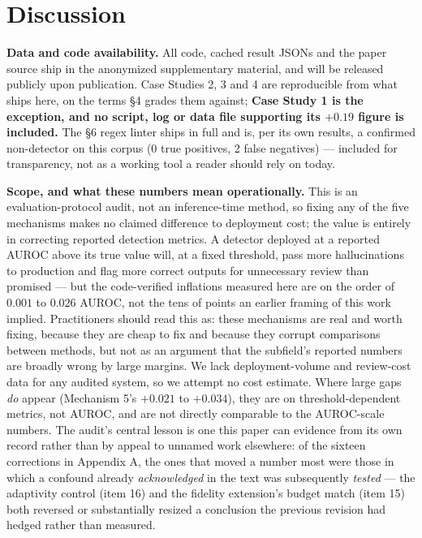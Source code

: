 \documentclass[10pt]{article} %
\begin{document}
\section{Discussion}

\textbf{Data and code availability.} All code, cached result JSONs and the paper
source ship in the anonymized supplementary material, and will be released
publicly upon publication. Case Studies 2, 3 and 4 are reproducible from what
ships here, on the terms §4 grades them against; \textbf{Case Study 1 is the
exception, and no script, log or data file supporting its $+0.19$ figure is
included.} The §6 regex linter ships in full and is, per its own results, a
confirmed non-detector on this corpus (0 true positives, 2 false negatives) ---
included for transparency, not as a working tool a reader should rely on
today.

\textbf{Scope, and what these numbers mean operationally.} This is an
evaluation-protocol audit, not an inference-time method, so fixing any of the
five mechanisms makes no claimed difference to deployment cost; the value is
entirely in correcting reported detection metrics. A detector deployed at a
reported AUROC above its true value will, at a fixed threshold, pass more
hallucinations to production and flag more correct outputs for unnecessary
review than promised --- but the code-verified inflations measured here are on
the order of $0.001$ to $0.026$ AUROC, not the tens of points an earlier
framing of this work implied. Practitioners should read this as: these
mechanisms are real and worth fixing, because they are cheap to fix and because
they corrupt comparisons between methods, but not as an argument that the
subfield's reported numbers are broadly wrong by large margins. We lack
deployment-volume and review-cost data for any audited system, so we attempt no
cost estimate. Where large gaps \emph{do} appear (Mechanism 5's $+0.021$ to
$+0.034$), they are on threshold-dependent metrics, not AUROC, and are not
directly comparable to the AUROC-scale numbers. The audit's central lesson is
one this paper can evidence from its own record rather than by appeal to
unnamed work elsewhere: of the sixteen corrections in Appendix A, the ones that
moved a number most were those in which a confound already \emph{acknowledged}
in the text was subsequently \emph{tested} --- the adaptivity control (item 16)
and the fidelity extension's budget match (item 15) both reversed or
substantially resized a conclusion the previous revision had hedged rather than
measured.
\end{document}
